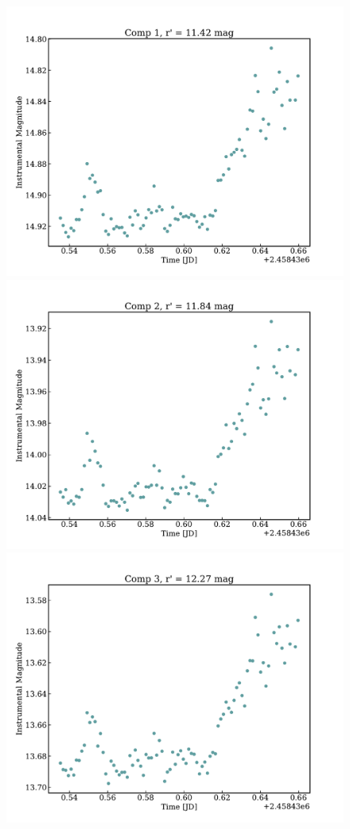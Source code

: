 \documentclass[11pt]{report}
\begin{document}
\begin{figure}[!htb]
  \includegraphics[width=\linewidth]{comp1r.pdf}
  \label{fig:comp1}
\endminipage\hfill
{}
  \includegraphics[width=\linewidth]{comp2r.pdf}
  \label{fig:comp2}
\endminipage\hfill
{}%
  \includegraphics[width=\linewidth]{comp3r.pdf}

\end{figure}
\end{document}
